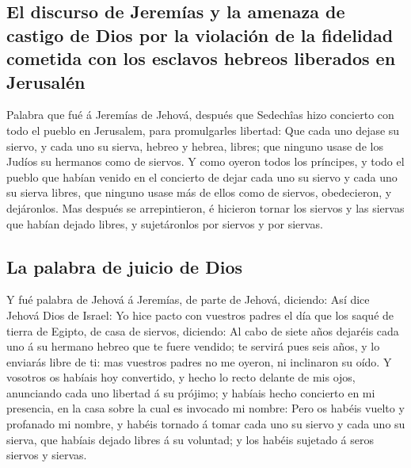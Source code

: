 \hypertarget{el-discurso-de-jeremuxedas-y-la-amenaza-de-castigo-de-dios-por-la-violaciuxf3n-de-la-fidelidad-cometida-con-los-esclavos-hebreos-liberados-en-jerusaluxe9n}{%
\subsection{El discurso de Jeremías y la amenaza de castigo de Dios por
la violación de la fidelidad cometida con los esclavos hebreos liberados
en
Jerusalén}\label{el-discurso-de-jeremuxedas-y-la-amenaza-de-castigo-de-dios-por-la-violaciuxf3n-de-la-fidelidad-cometida-con-los-esclavos-hebreos-liberados-en-jerusaluxe9n}}

 Palabra que fué á Jeremías de Jehová, después que
Sedechîas hizo concierto con todo el pueblo en Jerusalem, para
promulgarles libertad:  Que cada uno dejase su siervo, y
cada uno su sierva, hebreo y hebrea, libres; que ninguno usase de los
Judíos su hermanos como de siervos.  Y como oyeron todos
los príncipes, y todo el pueblo que habían venido en el concierto de
dejar cada uno su siervo y cada uno su sierva libres, que ninguno usase
más de ellos como de siervos, obedecieron, y dejáronlos. 
Mas después se arrepintieron, é hicieron tornar los siervos y las
siervas que habían dejado libres, y sujetáronlos por siervos y por
siervas.

\hypertarget{la-palabra-de-juicio-de-dios}{%
\subsection{La palabra de juicio de
Dios}\label{la-palabra-de-juicio-de-dios}}

 Y fué palabra de Jehová á Jeremías, de parte de Jehová,
diciendo:  Así dice Jehová Dios de Israel: Yo hice pacto
con vuestros padres el día que los saqué de tierra de Egipto, de casa de
siervos, diciendo:  Al cabo de siete años dejaréis cada
uno á su hermano hebreo que te fuere vendido; te servirá pues seis años,
y lo enviarás libre de ti: mas vuestros padres no me oyeron, ni
inclinaron su oído.  Y vosotros os habíais hoy
convertido, y hecho lo recto delante de mis ojos, anunciando cada uno
libertad á su prójimo; y habíais hecho concierto en mi presencia, en la
casa sobre la cual es invocado mi nombre:  Pero os habéis
vuelto y profanado mi nombre, y habéis tornado á tomar cada uno su
siervo y cada uno su sierva, que habíais dejado libres á su voluntad; y
los habéis sujetado á seros siervos y siervas.

